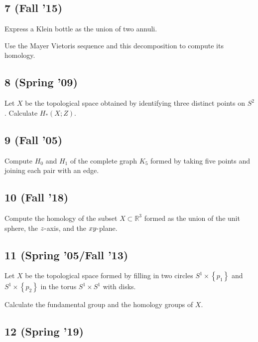 \hypertarget{fall-15-1}{%
\subsection{7 (Fall '15)}\label{fall-15-1}}

Express a Klein bottle as the union of two annuli.

Use the Mayer Vietoris sequence and this decomposition to compute its
homology.

\hypertarget{spring-09-5}{%
\subsection{8 (Spring '09)}\label{spring-09-5}}

Let \(X\) be the topological space obtained by identifying three
distinct points on \(S^2\). Calculate \(H_* (X; Z)\).

\hypertarget{fall-05-2}{%
\subsection{9 (Fall '05)}\label{fall-05-2}}

Compute \(H_0\) and \(H_1\) of the complete graph \(K_5\) formed by
taking five points and joining each pair with an edge.

\hypertarget{fall-18-4}{%
\subsection{10 (Fall '18)}\label{fall-18-4}}

Compute the homology of the subset \(X \subset {\mathbb{R}}^3\) formed
as the union of the unit sphere, the \(z{\hbox{-}}\)axis, and the
\(xy{\hbox{-}}\)plane.

\hypertarget{spring-05fall-13}{%
\subsection{11 (Spring '05/Fall '13)}\label{spring-05fall-13}}

Let \(X\) be the topological space formed by filling in two circles
\(S^1 \times \left\{{p_1 }\right\}\) and
\(S^1 \times \left\{{p_2 }\right\}\) in the torus \(S^1 \times S^1\)
with disks.

Calculate the fundamental group and the homology groups of \(X\).

\hypertarget{spring-19-3}{%
\subsection{12 (Spring '19)}\label{spring-19-3}}

